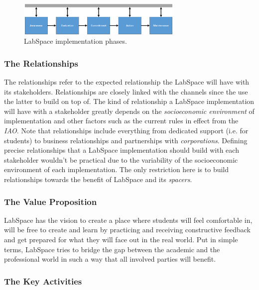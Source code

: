 \documentclass[a4paper, 11pt]{article}
\begin{document}
\begin{figure}[h!]
  \begin{center}
    \includegraphics[width=300px,height=\textheight,keepaspectratio]{imagery/ls_impl.png}
    \caption{LabSpace implementation phases.}
    \label{fig:implementation}
  \end{center}
\end{figure}

\subsubsection{The Relationships} \label{sec:bm_rel}

The relationships refer to the expected relationship the LabSpace will have with its stakeholders. Relationships are closely linked with the channels since the use the latter to build on top of. The kind of relationship a LabSpace implementation will have with a stakeholder greatly depends on the \textit{socioeconomic environment} of implementation and other factors such as the current rules in effect from the \textit{IAO}. Note that relationships include everything from dedicated support (i.e. for students) to business relationships and partnerships with \textit{corporations}. Defining precise relationships that a LabSpace implementation should build with each stakeholder wouldn't be practical due to the variability of the socioeconomic environment of each implementation. The only restriction here is to build relationships towards the benefit of LabSpace and its \textit{spacers}.


\subsubsection{The Value Proposition}

LabSpace has the vision to create a place where students will feel comfortable in, will be free to create and learn by practicing and receiving constructive feedback and get prepared for what they will face out in the real world. Put in simple terms, LabSpace tries to bridge the gap between the academic and the professional world in such a way that all involved parties will benefit.

\subsubsection{The Key Activities} \label{sec:bm_activities}
\end{document}
